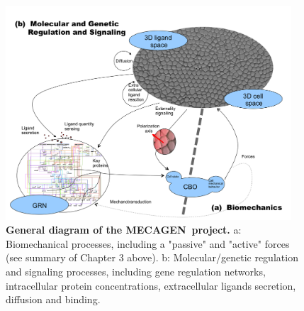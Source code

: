 \begin{figure}
\begin{center}
\includegraphics[width=0.95\textwidth]{../../images/MECAGEN/schematic/schemaMECAGEN.png}
\end{center}
\caption{\textbf{General diagram of the MECAGEN project.} a: Biomechanical processes, including a "passive" and "active" forces (see summary of Chapter 3 above). b: Molecular/genetic regulation and signaling processes, including gene regulation networks, intracellular protein concentrations, extracellular ligands secretion, diffusion and binding.}
\label{schematic_mecagen}
\end{figure}
